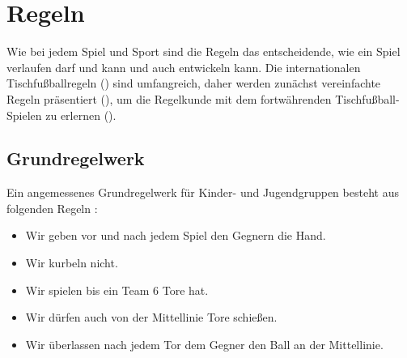 \chapter{Regeln}
\label{regeln}

Wie bei jedem Spiel und Sport sind die Regeln das entscheidende, wie ein Spiel verlaufen darf und kann und auch entwickeln kann. 
Die internationalen Tischfußballregeln () sind umfangreich, daher werden zunächst vereinfachte Regeln präsentiert (), um die Regelkunde mit dem fortwährenden Tischfußball-Spielen zu erlernen ().   

\section{Grundregelwerk}
\label{regeln:grundlagen}

Ein angemessenes Grundregelwerk für Kinder- und Jugendgruppen besteht aus folgenden Regeln \citep{www:hakitu}:
\begin{itemize}
\item Wir geben vor und nach jedem Spiel den Gegnern die Hand.
\item Wir kurbeln nicht.
\item Wir spielen bis ein Team 6 Tore hat.
\item Wir dürfen auch von der Mittellinie Tore schießen.
\item Wir überlassen nach jedem Tor dem Gegner den Ball an der Mittellinie.
\end{itemize}

